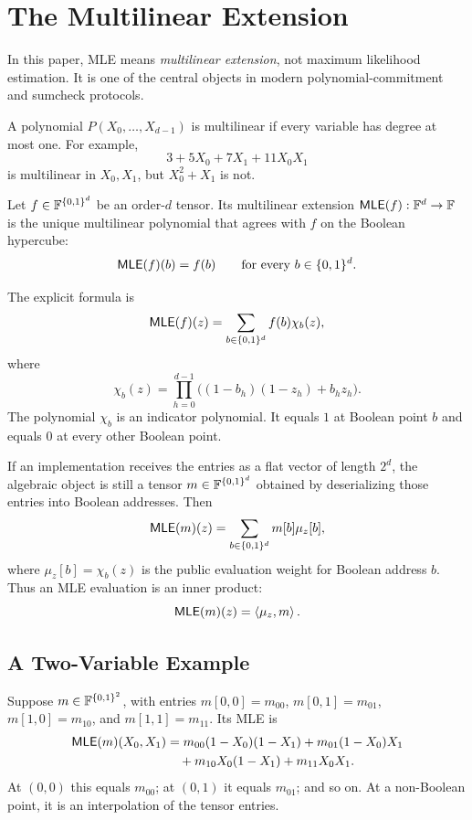 \section{The Multilinear Extension}

In this paper, MLE means \emph{multilinear extension}, not maximum likelihood
estimation.  It is one of the central objects in modern polynomial-commitment
and sumcheck protocols.

\begin{definition}
A polynomial $P(X_0,\ldots,X_{d-1})$ is multilinear if every variable has degree
at most one.  For example,
\[
  3+5X_0+7X_1+11X_0X_1
\]
is multilinear in $X_0,X_1$, but $X_0^2+X_1$ is not.
\end{definition}

\begin{definition}
Let $f\in\mathbb{F}^{\{0,1\}^d}$ be an order-$d$ tensor.  Its multilinear extension
$\mathsf{MLE}(f):\mathbb{F}^d\to\mathbb{F}$ is the unique multilinear polynomial
that agrees with $f$ on the Boolean hypercube:
\[
  \mathsf{MLE}(f)(b)=f(b)
  \qquad
  \text{for every }b\in\{0,1\}^d.
\]
\end{definition}

The explicit formula is
\[
  \mathsf{MLE}(f)(z)
  =
  \sum_{b\in\{0,1\}^d}
    f(b)\chi_b(z),
\]
where
\[
  \chi_b(z)
  =
  \prod_{h=0}^{d-1}
  \bigl((1-b_h)(1-z_h)+b_hz_h\bigr).
\]
The polynomial $\chi_b$ is an indicator polynomial.  It equals $1$ at Boolean
point $b$ and equals $0$ at every other Boolean point.

If an implementation receives the entries as a flat vector of length $2^d$, the
algebraic object is still a tensor $m\in\mathbb{F}^{\{0,1\}^d}$ obtained by deserializing
those entries into Boolean addresses.  Then
\[
  \mathsf{MLE}(m)(z)
  =
  \sum_{b\in\{0,1\}^d} m[b]\mu_z[b],
\]
where $\mu_z[b]=\chi_b(z)$ is the public evaluation weight for Boolean address
$b$.  Thus an MLE evaluation is an inner product:
\[
  \mathsf{MLE}(m)(z)=\left\langle \mu_z,m \right\rangle.
\]

\subsection{A Two-Variable Example}

Suppose $m\in\mathbb{F}^{\{0,1\}^2}$, with entries
$m[0,0]=m_{00}$, $m[0,1]=m_{01}$, $m[1,0]=m_{10}$, and
$m[1,1]=m_{11}$.  Its MLE is
\[
\begin{aligned}
  \mathsf{MLE}(m)(X_0,X_1)
  &=
  m_{00}(1-X_0)(1-X_1)
  + m_{01}(1-X_0)X_1\\
  &\quad
  + m_{10}X_0(1-X_1)
  + m_{11}X_0X_1.
\end{aligned}
\]
At $(0,0)$ this equals $m_{00}$; at $(0,1)$ it equals $m_{01}$; and so on.
At a non-Boolean point, it is an interpolation of the tensor entries.

